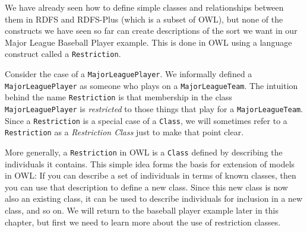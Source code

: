 We have already seen how to define simple classes and relationships
between them in RDFS and RDFS-Plus (which is a subset of OWL), but none of the constructs we have seen so
far can create descriptions of the sort we want in our Major League
Baseball Player example. This is done in OWL using a language construct
called a \texttt{Restriction}.

Consider the case of a \texttt{MajorLeaguePlayer}. We informally defined a \texttt{MajorLeaguePlayer} as someone who plays on a \texttt{MajorLeagueTeam}. The intuition
behind the name \texttt{Restriction} is that membership in the class
\texttt{MajorLeaguePlayer} is \emph{restricted} to those things that play for a
\texttt{MajorLeagueTeam}. Since a \texttt{Restriction} is a special case of a \texttt{Class}, we
will sometimes refer to a \texttt{Restriction} as a \emph{Restriction Class} just to
make that point clear.

More generally, a \texttt{Restriction} in OWL is a \texttt{Class} defined by describing
the individuals it contains. This simple idea forms the basis for
extension of models in OWL: If you can describe a set of individuals in
terms of known classes, then you can use that description to define a
new class. Since this new class is now also an existing class, it can be
used to describe individuals for inclusion in a new class, and so on. We
will return to the baseball player example later in this chapter, but
first we need to learn more about the use of restriction classes.

